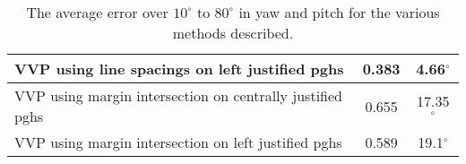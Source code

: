 \begin{table}[t]
\begin{center}
\begin{tabular}{|p{95mm}|c|c|}
      VVP using line spacings on left justified pghs & 0.383 & 4.66$^\circ$ \\ \hline
      VVP using margin intersection on centrally justified pghs & 0.655 & 17.35$^\circ$ \\ \hline  \hline
      VVP using margin intersection on left justified pghs & 0.589 & 19.1$^\circ$ \\   \hline
   \end{tabular}
  \end{center}
  \caption{The average error over $10^\circ$ to $80^{\circ}$ in yaw and pitch for the various methods described.}
  \label{accuracytable}
\end{table}

